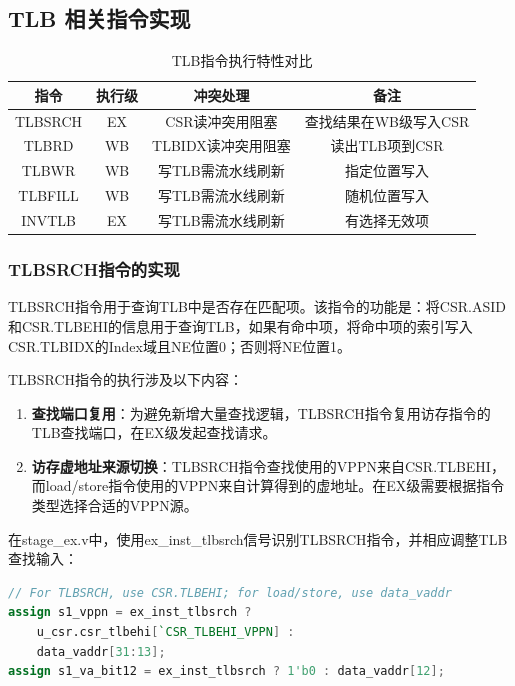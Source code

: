 \subsection{TLB 相关指令实现}

\begin{table}[h]
\centering
\caption{TLB指令执行特性对比}
\begin{tabular}{|c|c|c|c|}
\hline
\textbf{指令} & \textbf{执行级} & \textbf{冲突处理} & \textbf{备注} \\
\hline
TLBSRCH & EX & CSR读冲突用阻塞 & 查找结果在WB级写入CSR \\
\hline
TLBRD & WB & TLBIDX读冲突用阻塞 & 读出TLB项到CSR \\
\hline
TLBWR & WB & 写TLB需流水线刷新 & 指定位置写入 \\
\hline
TLBFILL & WB & 写TLB需流水线刷新 & 随机位置写入 \\
\hline
INVTLB & EX & 写TLB需流水线刷新 & 有选择无效项 \\
\hline
\end{tabular}
\end{table}

\subsubsection{TLBSRCH指令的实现}

TLBSRCH指令用于查询TLB中是否存在匹配项。该指令的功能是：将CSR.ASID和CSR.TLBEHI的信息用于查询TLB，如果有命中项，将命中项的索引写入CSR.TLBIDX的Index域且NE位置0；否则将NE位置1。

TLBSRCH指令的执行涉及以下内容：

\begin{enumerate}
    \item \textbf{查找端口复用}：为避免新增大量查找逻辑，TLBSRCH指令复用访存指令的TLB查找端口，在EX级发起查找请求。
    
    
    \item \textbf{访存虚地址来源切换}：TLBSRCH指令查找使用的VPPN来自CSR.TLBEHI，而load/store指令使用的VPPN来自计算得到的虚地址。在EX级需要根据指令类型选择合适的VPPN源。
\end{enumerate}

在stage\_ex.v中，使用ex\_inst\_tlbsrch信号识别TLBSRCH指令，并相应调整TLB查找输入：

\begin{lstlisting}[language=Verilog, caption=TLBSRCH虚地址源选择逻辑]
// For TLBSRCH, use CSR.TLBEHI; for load/store, use data_vaddr
assign s1_vppn = ex_inst_tlbsrch ? 
    u_csr.csr_tlbehi[`CSR_TLBEHI_VPPN] : 
    data_vaddr[31:13];
assign s1_va_bit12 = ex_inst_tlbsrch ? 1'b0 : data_vaddr[12];
\end{lstlisting}

